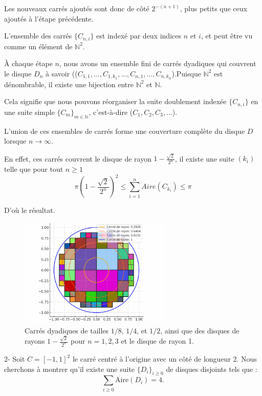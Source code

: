 Les nouveaux carr{\'e}s ajout{\'e}s sont donc de c{\^o}t{\'e} $2^{- (n +
1)}$, plus petits que ceux ajout{\'e}s {\`a} l'{\'e}tape pr{\'e}c{\'e}dente.

L'ensemble des carr{\'e}s $\{C_{n, i} \}$ est index{\'e} par deux indices $n$
et $i$, et peut {\^e}tre vu comme un {\'e}l{\'e}ment de $\mathbb{N}^2$.

{\`A} chaque {\'e}tape $n$, nous avons un ensemble fini de carr{\'e}s
dyadiques qui couvrent le disque $D_n$ {\`a} savoir (($C_{1, 1}, ..., C_{1,
k_1}, ..., C_{n, 1}, ..., C_{n, k_n}$).Puisque $\mathbb{N}^2$ est
d{\'e}nombrable, il existe une bijection entre $\mathbb{N}^2$ et $\mathbb{N}$.

Cela signifie que nous pouvons r{\'e}organiser la suite doublement
index{\'e}e $\{C_{n, i} \}$ en une suite simple $\{C_m \}_{m \in \mathbb{N}}$,
c'est-{\`a}-dire ($C_1, C_2, C_3, \ldots$).

L'union de ces ensembles de carr{\'e}s forme une couverture compl{\`e}te du
disque $D$ lorsque $n \to \infty$.

En effet, ces carr{\'e}s couvrent le disque de rayon $1 -
\frac{\sqrt{2}}{2^n}$, il existe une suite $(k_i)$ telle que pour tout $n \geq
1$
\[ \pi \left( 1 - \frac{\sqrt{2}}{2^n} \right)^2 \leq \sum_{i = 1}^n Aire
   (C_{k_i}) \leq \pi \]


D'o{\`u} le r{\'e}sultat.

\begin{figure}[h]
  \centering
  \includegraphics[width=7.249cm,height=5.193cm]{figures/Math_oraux-3.pdf}
  \caption{Carr{\'e}s dyadiques de tailles $1 / 8$, $1 / 4$, et $1 / 2$, ainsi
  que des disques de rayons $1 - \frac{\sqrt{2}}{2^n}$ pour $n = 1, 2, 3$ et
  le disque de rayon 1.}
\end{figure}


2- Soit $C = [- 1, 1]^2$ le carr{\'e} centr{\'e} {\`a} l'origine avec un
c{\^o}t{\'e} de longueur 2. Nous cherchons {\`a} montrer qu'il existe une
suite $\{D_i \}_{i \geq 0}$ de disques disjoints tels que :
\[ \sum_{i \geq 0} \text{Aire} (D_i) = 4. \]


